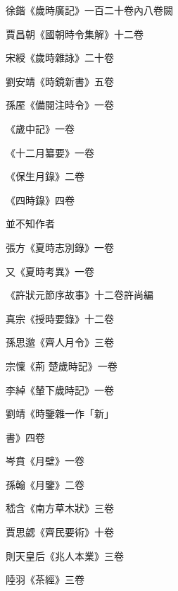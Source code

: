 \begin{pinyinscope}
 徐鍇《歲時廣記》一百二十卷內八卷闕



 賈昌朝《國朝時令集解》十二卷



 宋綬《歲時雜詠》二十卷



 劉安靖《時鏡新書》五卷



 孫厔《備閱注時令》一卷



 《歲中記》一卷



 《十二月纂要》一卷



 《保生月錄》二卷



 《四時錄》四卷



 並不知作者



 張方《夏時志別錄》一卷



 又《夏時考異》一卷



 《許狀元節序故事》十二卷許尚編



 真宗《授時要錄》十二卷



 孫思邈《齊人月令》三卷



 宗懍《荊
 楚歲時記》一卷



 李綽《輦下歲時記》一卷



 劉靖《時鑒雜一作「新」



 書》四卷



 岑賁《月壁》一卷



 孫翰《月鑒》二卷



 嵇含《南方草木狀》三卷



 賈思勰《齊民要術》十卷



 則天皇后《兆人本業》三卷



 陸羽《茶經》三卷




\end{pinyinscope}
